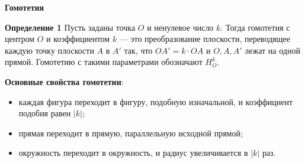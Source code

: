 \documentclass{article}
\begin{document}
    \large

    \begin{center}
        \textbf{Гомотетия}
    \end{center}

    \textbf{Определение 1} Пусть заданы точка $O$ и ненулевое число $k$.
    Тогда гомотетия с центром $O$ и коэффициентом $k$ — это преобразование плоскости, переводящее каждую точку плоскости $A$ в $A'$ так, что $OA' = k\cdot OA$ и $O, A, A'$ лежат на одной прямой.
    Гомотетию с такими параметрами обозначают $H^k_O$.

    \textbf{Основные свойства гомотетии}:
    \begin{itemize}
        \item каждая фигура переходит в фигуру, подобную изначальной, и коэффициент подобия равен $|k|$;

        \item прямая переходит в прямую, параллельную исходной прямой;

        \item окружность переходит в окружность, и радиус увеличивается в $|k|$ раз.
    \end{itemize}
\end{document}
